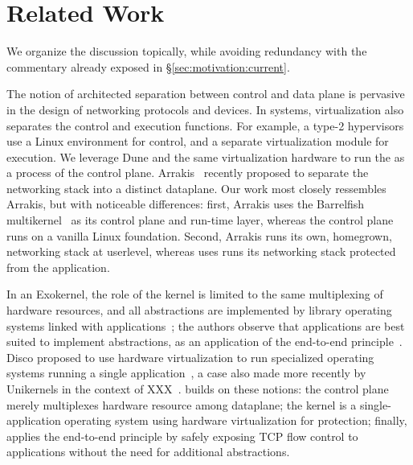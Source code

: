 

\section{Related Work}
\label{sec:related}

We organize the discussion topically, while avoiding redundancy with
the commentary already exposed in \S\ref{sec:motivation:current}.


 The notion of
architected separation between control and data plane is pervasive in
the design of networking protocols and devices.  In systems,
virtualization also separates the control and execution functions. For
example, a type-2
hypervisors~\cite{DBLP:journals/tocs/BugnionDRSW12,misc/kivity07kvm}
use a Linux environment for control, and a separate virtualization
module for execution.  We leverage Dune and the same virtualization
hardware to run the \ix as a process of the control plane.
Arrakis~\cite{peter2013arrakis,arrakisTR13} recently proposed to
separate the networking stack into a distinct dataplane.  Our work
most closely ressembles Arrakis, but with noticeable differences:
first, Arrakis uses the Barrelfish multikernel~\cite{DBLP:conf/sosp/BaumannBDHIPRSS09} as its control plane
and run-time layer, whereas the \ix control plane runs on a vanilla
Linux foundation.  Second, Arrakis runs its own, homegrown, networking
stack at userlevel, whereas \ix uses runs its networking stack
protected from the application.

In an Exokernel, the role of the kernel is limited to the same
multiplexing of hardware resources, and all abstractions are
implemented by library operating systems linked with
applications~\cite{DBLP:conf/sosp/EnglerKO95}; the authors observe
that applications are best suited to implement abstractions, as an
application of the end-to-end
principle~\cite{DBLP:journals/tocs/SaltzerRC84}.  Disco proposed to
use hardware virtualization to run specialized operating systems
running a single application~\cite{DBLP:journals/tocs/BugnionDGR97}, a
case also made more recently by Unikernels in the context of
XXX~\cite{DBLP:conf/asplos/MadhavapeddyMRSSGSHC13}.  \ix builds on
these notions: the control plane merely multiplexes hardware resource
among dataplane; the \ix kernel is a single-application operating
system using hardware virtualization for protection; finally, \ix
applies the end-to-end principle by safely exposing TCP flow control
to applications without the need for additional abstractions.


